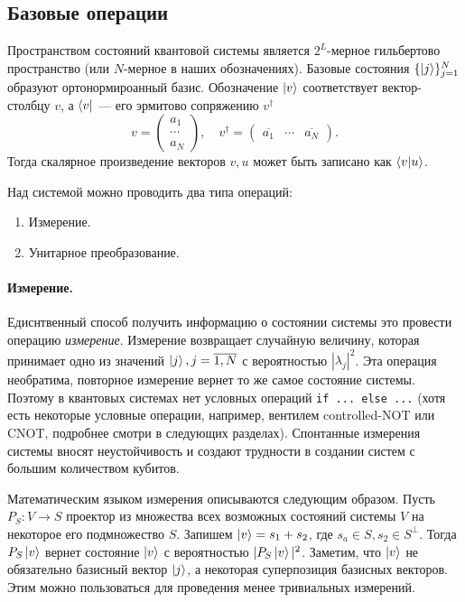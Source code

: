 \documentclass{article}
\theoremstyle{definition}
\begin{document}
\subsection{Базовые операции}

Пространством состояний квантовой системы является $2^L$-мерное гильбертово пространство
(или $N$-мерное в наших обозначениях).
Базовые состояния $\{\ket{j}\}_{j=1}^N$ образуют ортонормироанный базис.
Обозначение $\ket{v}$ соответствует вектор-столбцу $v$, а $\bra{v}$ --- его эрмитово сопряжению $v^\dag$
\[
    v = \begin{pmatrix}
    a_1 \\
    \cdots \\
    a_N 
    \end{pmatrix},
    \quad
    v^\dag = \begin{pmatrix} \overline{a_1} & \cdots & \overline{a_N} \end{pmatrix}.
\]
Тогда скалярное произведение векторов $v, u$ может быть записано как $\bra{v}\ket{u}$.

Над системой можно проводить два типа операций:
\begin{enumerate}
    \item Измерение.
    \item Унитарное преобразование.
\end{enumerate}

\paragraph*{Измерение.}
Едиснтвенный способ получить информацию о состоянии системы это провести операцию {\em измерение}.
Измерение возвращает случайную величину, которая принимает одно из значений $\ket{j}, j=\overline{1, N}$
с вероятностью $|\lambda_j|^2$.
Эта операция необратима, повторное измерение вернет то же самое состояние системы.
Поэтому в квантовых системах нет условных операций \texttt{if ... else ...} (хотя есть некоторые условные операции, например, вентилем controlled-NOT или CNOT, подробнее смотри в следующих разделах).
Спонтанные измерения системы вносят неустойчивость и создают трудности в создании систем с большим количеством кубитов.

Математическим языком измерения описываются следующим образом.
Пусть $P_S \colon V \rightarrow S$ проектор из множества всех возможных состояний системы $V$
на некоторое его подмножество $S$.
Запишем $\ket{v} = s_1 + s_2$, где $s_a \in S, s_2 \in S^\bot$.
Тогда $P_S\ket{v}$ вернет состояние $\ket{v}$ с вероятностью $|P_S\ket{v}|^2$.
Заметим, что $\ket{v}$ не обязательно базисный вектор $\ket{j}$, а некоторая суперпозиция базисных векторов.
Этим можно пользоваться для проведения менее тривиальных измерений.
\end{document}
